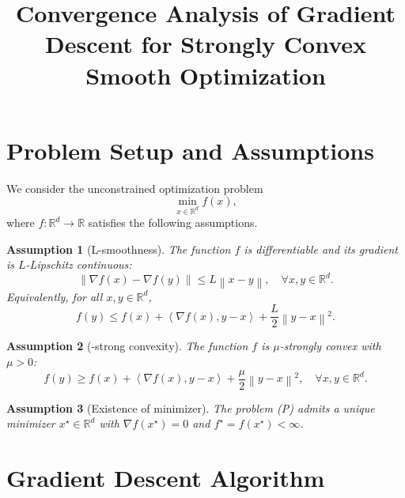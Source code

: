 \documentclass{article}
\newtheorem{assumption}{Assumption}
\newcommand{\R}{\mathbb{R}}
\newcommand{\norm}[1]{\left\|#1\right\|}
\newcommand{\inner}[2]{\left\langle #1, #2 \right\rangle}
\newcommand{\lipschitz}{L}
\newcommand{\strongconvex}{\mu}
\newcommand{\opt}{x^\star}
\newcommand{\grad}{\nabla}
\begin{document}
\title{Convergence Analysis of Gradient Descent for Strongly Convex Smooth Optimization}
\author{}
\date{}
\maketitle

\section{Problem Setup and Assumptions}

We consider the unconstrained optimization problem
\begin{equation}
    \min_{x \in \R^d} f(x), \tag{P}
\end{equation}
where $f: \R^d \to \R$ satisfies the following assumptions.

\begin{assumption}[L-smoothness] \label{assump:smooth}
    The function $f$ is differentiable and its gradient is $\lipschitz$-Lipschitz continuous:
    \begin{equation}
        \norm{\grad f(x) - \grad f(y)} \le \lipschitz \norm{x - y}, \quad \forall x, y \in \R^d.
    \end{equation}
    Equivalently, for all $x, y \in \R^d$,
    \begin{equation}
        f(y) \le f(x) + \inner{\grad f(x)}{y - x} + \frac{\lipschitz}{2} \norm{y - x}^2. \tag{A1}
    \end{equation}
\end{assumption}

\begin{assumption}[\strongconvex-strong convexity] \label{assump:strong-convex}
    The function $f$ is $\strongconvex$-strongly convex with $\strongconvex > 0$:
    \begin{equation}
        f(y) \ge f(x) + \inner{\grad f(x)}{y - x} + \frac{\strongconvex}{2} \norm{y - x}^2, \quad \forall x, y \in \R^d. \tag{A2}
    \end{equation}
\end{assumption}

\begin{assumption}[Existence of minimizer] \label{assump:minimizer}
    The problem (P) admits a unique minimizer $\opt \in \R^d$ with $\grad f(\opt) = 0$ and $f^\star = f(\opt) < \infty$.
\end{assumption}

\section{Gradient Descent Algorithm}
\end{document}
